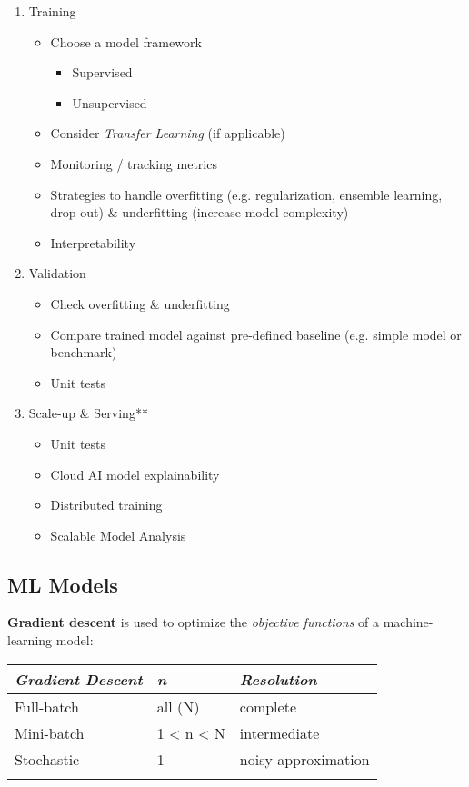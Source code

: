 \documentclass[10pt,landscape,letterpaper]{cheatsheet}
\begin{document}
\begin{multicols}{3}
\begin{enumerate}
    \item Training
    \begin{itemize}
        \item Choose a model framework
        \begin{itemize}
            \item Supervised 
            \item Unsupervised
        \end{itemize}
        \item Consider \emph{Transfer Learning} (if applicable)
        \item Monitoring / tracking metrics
        \item Strategies to handle overfitting (e.g. regularization, ensemble learning, drop-out) \& underfitting (increase model complexity)
        \item Interpretability
    \end{itemize}
    \item Validation
    \begin{itemize}
        \item Check overfitting \& underfitting
        \item Compare trained model against pre-defined baseline (e.g. simple model or benchmark)
        \item Unit tests
    \end{itemize}
    \item Scale-up \& Serving**
    \begin{itemize}
        \item Unit tests
        \item Cloud AI model explainability
        \item Distributed training
        \item Scalable Model Analysis
    \end{itemize}
\end{enumerate}

\subsection{ML Models}

\textbf{Gradient descent} is used to optimize the \emph{objective functions} of a machine-learning model: 

\begin{tabular}{lll}
    \toprule
    \emph{Gradient Descent} & \emph{n} & \emph{Resolution}\\
    \midrule
    Full-batch & all (N) & complete \\
    Mini-batch & 1 < n < N  & intermediate \\
    Stochastic & 1 & noisy approximation \\
    \bottomrule\addlinespace
\end{tabular}


\end{multicols}
\end{document}

